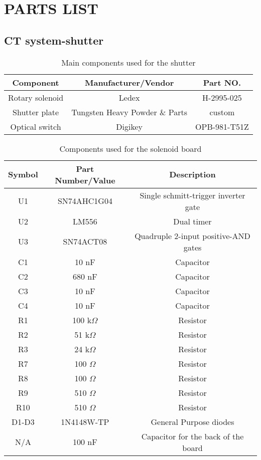 \chapter{PARTS LIST}\label{app:partslist}


\section{CT system-shutter}

\begin{table}[h]
\begin{tabular}{c|c|c}
\hline
\textbf{Component} & \textbf{Manufacturer/Vendor} & \textbf{Part NO.} \\ \hline \hline
Rotary solenoid & Ledex & H-2995-025 \\ \hline
Shutter plate & Tungsten Heavy Powder \& Parts & custom \\ \hline
Optical switch & Digikey & OPB-981-T51Z \\ \hline
\end{tabular}
\caption{Main components used for the shutter}
\label{table:shutter_components}
\end{table}

\begin{table}[h]
\begin{tabular}{c|c|c}
\hline
\textbf{Symbol} & \textbf{Part Number/Value} & \textbf{Description} \\
\hline
U1 & SN74AHC1G04 & Single schmitt-trigger inverter gate \\ \hline
U2 & LM556 & Dual timer \\ \hline
U3 & SN74ACT08 & Quadruple 2-input positive-AND gates \\ \hline
C1 & 10 nF & Capacitor \\ \hline
C2 & 680 nF & Capacitor \\ \hline
C3 & 10 nF & Capacitor \\ \hline
C4 & 10 nF & Capacitor \\ \hline
R1 & 100 k$\Omega$ & Resistor \\ \hline
R2 & 51 k$\Omega$ & Resistor \\ \hline
R3 & 24 k$\Omega$ & Resistor \\ \hline
R7 & 100 $\Omega$ & Resistor \\ \hline
R8 & 100 $\Omega$ & Resistor \\ \hline
R9 & 510 $\Omega$ & Resistor \\ \hline
R10 & 510 $\Omega$ & Resistor \\ \hline
D1-D3 & 1N4148W-TP & General Purpose diodes\\ \hline
N/A & 100 nF & Capacitor for the back of the board\\ \hline
\end{tabular}
\caption{Components used for the solenoid board}
\label{table:solenoid_components}
\end{table}




